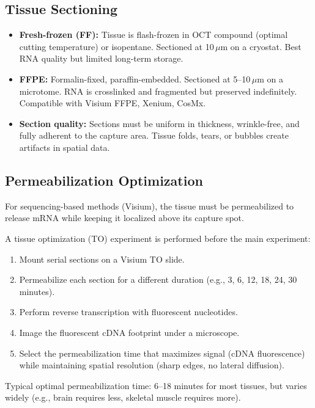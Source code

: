\subsection{Tissue Sectioning}

\begin{itemize}[nosep]
  \item \textbf{Fresh-frozen (FF):} Tissue is flash-frozen in OCT compound
    (optimal cutting temperature) or isopentane. Sectioned at 10\,$\mu$m on a
    cryostat. Best RNA quality but limited long-term storage.
  \item \textbf{FFPE:} Formalin-fixed, paraffin-embedded. Sectioned at
    5--10\,$\mu$m on a microtome. RNA is crosslinked and fragmented but
    preserved indefinitely. Compatible with Visium FFPE, Xenium, CosMx.
  \item \textbf{Section quality:} Sections must be uniform in thickness,
    wrinkle-free, and fully adherent to the capture area. Tissue folds,
    tears, or bubbles create artifacts in spatial data.
\end{itemize}

\subsection{Permeabilization Optimization}

For sequencing-based methods (Visium), the tissue must be permeabilized to
release mRNA while keeping it localized above its capture spot.

\begin{protocolbox}[title={Visium Permeabilization Optimization}]
A tissue optimization (TO) experiment is performed before the main experiment:
\begin{enumerate}[nosep]
  \item Mount serial sections on a Visium TO slide.
  \item Permeabilize each section for a different duration (e.g., 3, 6, 12, 18,
    24, 30 minutes).
  \item Perform reverse transcription with fluorescent nucleotides.
  \item Image the fluorescent cDNA footprint under a microscope.
  \item Select the permeabilization time that maximizes signal (cDNA
    fluorescence) while maintaining spatial resolution (sharp edges, no
    lateral diffusion).
\end{enumerate}
Typical optimal permeabilization time: 6--18 minutes for most tissues, but
varies widely (e.g., brain requires less, skeletal muscle requires more).
\end{protocolbox}

